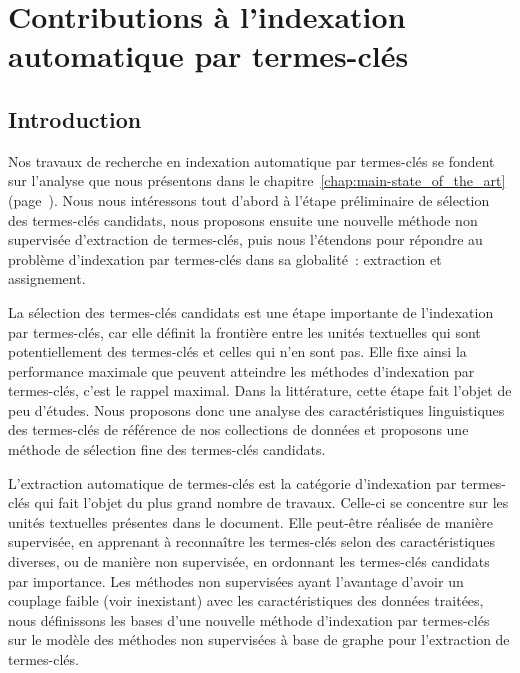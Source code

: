 \chapter{Contributions à l'indexation automatique par termes-clés}
\label{chap:main-automatic_keyphrase_annotation}

  \section{Introduction}
  \label{sec:main-automatic_keyphrase_annotation-introduction}
    Nos travaux de recherche en indexation automatique par termes-clés se
    fondent sur l'analyse que nous présentons dans le
    chapitre~\ref{chap:main-state_of_the_art}
    (page~\pageref{chap:main-state_of_the_art}). Nous nous intéressons tout
    d'abord à l'étape préliminaire de sélection des termes-clés candidats, nous
    proposons ensuite une nouvelle méthode non supervisée d'extraction de
    termes-clés, puis nous l'étendons pour répondre au problème d'indexation par
    termes-clés dans sa globalité~: extraction et assignement.

    La sélection des termes-clés candidats est une étape importante de
    l'indexation par termes-clés, car elle définit la frontière entre les unités
    textuelles qui sont potentiellement des termes-clés et celles qui n'en sont
    pas. Elle fixe ainsi la performance maximale que peuvent atteindre les
    méthodes d'indexation par termes-clés, c'est le rappel maximal. Dans la
    littérature, cette étape fait l'objet de peu d'études. Nous proposons donc
    une analyse des caractéristiques linguistiques des termes-clés de référence
    de nos collections de données et proposons une méthode de sélection fine des
    termes-clés candidats.

    L'extraction automatique de termes-clés est la catégorie d'indexation par
    termes-clés qui fait l'objet du plus grand nombre de travaux. Celle-ci se
    concentre sur les unités textuelles présentes dans le document. Elle
    peut-être réalisée de manière supervisée, en apprenant à reconnaître les
    termes-clés selon des caractéristiques diverses, ou de manière non
    supervisée, en ordonnant les termes-clés candidats par importance. Les
    méthodes non supervisées ayant l'avantage d'avoir un couplage faible (voir
    inexistant) avec les caractéristiques des données traitées, nous définissons
    les bases d'une nouvelle méthode d'indexation par termes-clés sur le modèle
    des méthodes non supervisées à base de graphe pour l'extraction de
    termes-clés.

